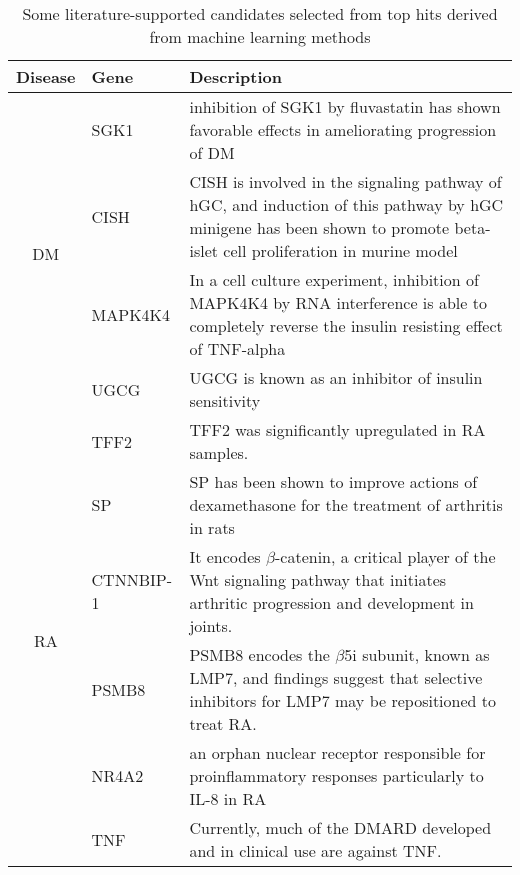    \begin{sidewaystable}
    \centering
    \caption{Some literature-supported candidates selected from top hits derived from machine learning methods}
    \begin{threeparttable}
      \begin{tabular}{cll}
      \toprule
      \textbf{Disease} & \textbf{Gene} & \textbf{Description} \\
      \midrule
      \multirow{4}[0]{*}{DM} & SGK1  & \multicolumn{1}{p{40.25em}}{inhibition of SGK1 by fluvastatin has shown favorable effects in ameliorating progression of DM} \\
            & CISH  & \multicolumn{1}{p{40.25em}}{CISH is involved in the signaling pathway of hGC, and induction of this pathway\newline{} by hGC minigene has been shown to promote beta-islet cell proliferation in murine model} \\
            & MAPK4K4 & \multicolumn{1}{p{40.25em}}{In a cell culture experiment, inhibition of MAPK4K4 by RNA interference is able to \newline{}completely reverse the insulin resisting effect of TNF-alpha} \\
            & UGCG  & UGCG is known as an inhibitor of insulin sensitivity \\
      \midrule
      \multirow{6}[0]{*}{RA} & TFF2  & TFF2 was significantly upregulated in RA samples. \\
            & SP    & SP has been shown to improve actions of dexamethasone for the treatment of arthritis in rats \\
            & CTNNBIP-1 & \multicolumn{1}{p{40.25em}}{It encodes $\beta$-catenin, a critical player of the Wnt signaling pathway that \newline{}initiates arthritic progression and development in joints.} \\
            & PSMB8 & \multicolumn{1}{p{40.25em}}{PSMB8 encodes the $\beta$5i subunit, known as LMP7, and \newline{}findings suggest that selective inhibitors for LMP7 may be repositioned to treat RA.} \\
            & NR4A2 & \multicolumn{1}{p{40.25em}}{an orphan nuclear receptor responsible for proinflammatory responses particularly to IL-8 in RA} \\
            & TNF   & Currently, much of the DMARD developed and in clinical use are against TNF. \\
      \midrule

\end{tabular}
\end{threeparttable}
\end{sidewaystable}
